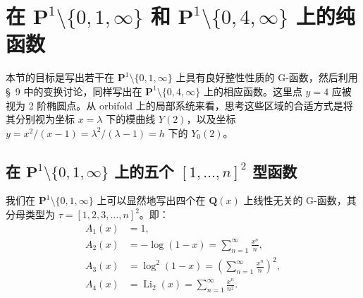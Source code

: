 \section{在 $\mathbf{P}^1 \setminus \{0,1,\infty\}$ 和 $\mathbf{P}^1 \setminus \{0,4,\infty\}$ 上的纯函数}\label{sec:10}

本节的目标是写出若干在 $\mathbf{P}^1 \setminus \{0, 1, \infty\}$ 上具有良好整性性质的 G-函数，然后利用 \S~9 中的变换讨论，同样写出在 $\mathbf{P}^1 \setminus \{0, 4, \infty\}$ 上的相应函数。这里点 $y = 4$ 应被视为 2 阶椭圆点。从 orbifold 上的局部系统来看，思考这些区域的合适方式是将其分别视为坐标 $x = \lambda$ 下的模曲线 $Y(2)$，以及坐标 $y = x^2/(x-1) = \lambda^2/(\lambda-1) = h$ 下的 $Y_0(2)$。

\subsection{在 $\mathbf{P}^1 \setminus \{0, 1, \infty\}$ 上的五个 $[1, \dots, n]^2$ 型函数}\label{sec:10.1}

我们在 $\mathbf{P}^1 \setminus \{0, 1, \infty\}$ 上可以显然地写出四个在 $\mathbf{Q}(x)$ 上线性无关的 G-函数，其分母类型为 $\tau = [1, 2, 3, \dots, n]^2$。即：
\begin{equation}\label{eq:10.1.1}\tag{10.1.1}
\begin{aligned}
A_{1}(x) &= 1, \\
A_{2}(x) &= -\log(1 - x) = \sum_{n=1}^{\infty} \frac{x^{n}}{n}, \\
A_{3}(x) &= \log^{2}(1 - x) = \left(\sum_{n=1}^{\infty} \frac{x^{n}}{n}\right)^{2}, \\
A_{4}(x) &= \operatorname{Li}_{2}(x) = \sum_{n=1}^{\infty} \frac{x^{n}}{n^{2}}.
\end{aligned}
\end{equation}

